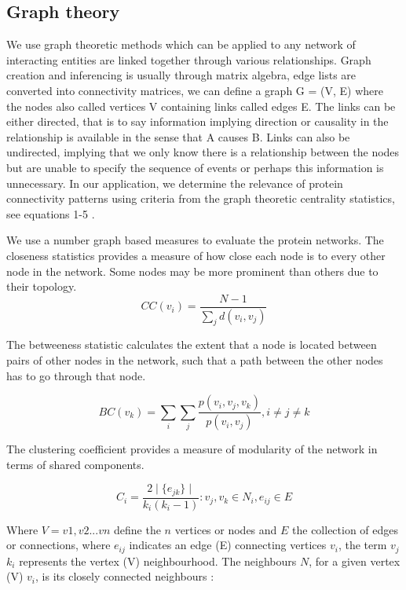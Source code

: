 \documentclass[preprint,12pt]{elsarticle}
\begin{document}
 \subsection{Graph theory}
 We use graph theoretic methods which can be applied to any network of interacting entities are linked together through various relationships.  Graph creation and inferencing is usually through matrix algebra, edge lists are converted into connectivity matrices, we can define a graph G = (V, E) where the nodes also called vertices V containing links called edges E. The links can be either directed, that is to say information implying direction or causality in the relationship is available in the sense that A causes B. Links can also be undirected, implying that we only know there is a relationship between the nodes but are unable to specify the sequence of events or perhaps this information is unnecessary. In our application, we determine the relevance of protein connectivity patterns using criteria from the graph theoretic centrality statistics, see equations 1-5 \cite{Freeman1979, Albert2002, Barabasi2004}.

We use a number graph based measures to evaluate the protein networks. %
The closeness statistics provides a measure of how close each node is to every other node in the network. Some nodes may be more prominent than others due to their topology.
\begin{equation}\label{closeness}
     CC(v_i) =  \frac{N - 1}{\sum_{j} d(v_i,v_j)}
\end{equation}

The betweeness statistic calculates the extent that a node is located between pairs of other nodes in the network, such that a path between the other nodes has to go through that node.

\begin{equation}\label{betweenness}
     BC (v_k) =  \sum_{i} \sum_{j} \frac{p(v_i,v_j,v_k)}{p(v_i,v_j)}, i \neq j \neq k
\end{equation}

The clustering coefficient provides a measure of modularity of the network in terms of shared components.

\begin{equation}\label{clustercoeff}
     C_{i}  =  \frac{2\mid\{e_{jk} \}\mid}{k_{i}(k_{i} - 1)} : v_{j}, v_{k} \in N_{i}, e_{ij} \in E
\end{equation}

Where $V = v1, v2  ... vn$ define the $n$ vertices or nodes and $E$ the collection of edges or connections, where $e_{ij}$ indicates an edge (E) connecting vertices $v_i$, the term $v_j$ $k_i$ represents the vertex (V) neighbourhood. The neighbours $N$, for a given vertex (V) $v_i$, is its closely connected neighbours :
\end{document}
